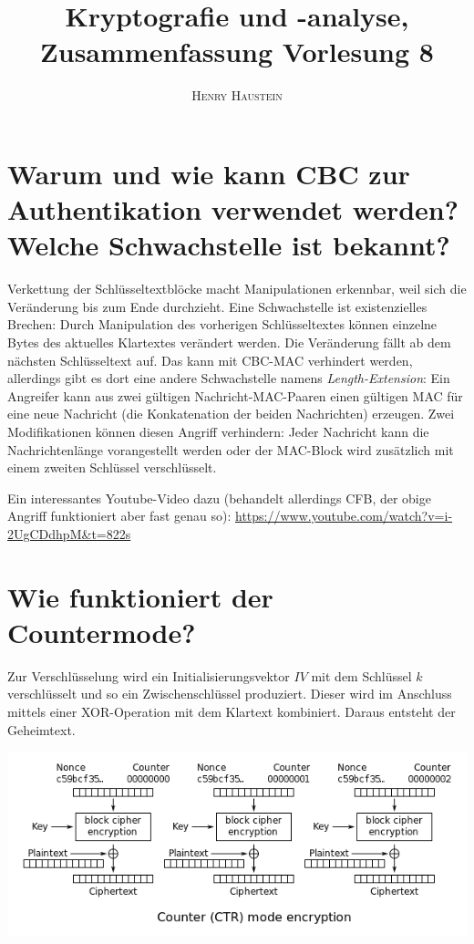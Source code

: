 \documentclass{article}
\title{\textbf{Kryptografie und -analyse, Zusammenfassung Vorlesung 8}}
\author{\textsc{Henry Haustein}}
\date{}
\begin{document}
	\maketitle
	
	\section*{Warum und wie kann CBC zur Authentikation verwendet werden? Welche Schwachstelle ist bekannt?}
	Verkettung der Schlüsseltextblöcke macht Manipulationen erkennbar, weil sich die Veränderung bis zum Ende durchzieht. Eine Schwachstelle ist existenzielles Brechen: Durch Manipulation des vorherigen Schlüsseltextes können einzelne Bytes des aktuelles Klartextes verändert werden. Die Veränderung fällt ab dem nächsten Schlüsseltext auf. Das kann mit CBC-MAC verhindert werden, allerdings gibt es dort eine andere Schwachstelle namens \textit{Length-Extension}: Ein Angreifer kann aus zwei gültigen Nachricht-MAC-Paaren einen gültigen MAC für eine neue Nachricht (die Konkatenation der beiden Nachrichten) erzeugen. Zwei Modifikationen können diesen Angriff verhindern: Jeder Nachricht kann die Nachrichtenlänge vorangestellt werden oder der MAC-Block wird zusätzlich mit einem zweiten Schlüssel verschlüsselt.
	
	Ein interessantes Youtube-Video dazu (behandelt allerdings CFB, der obige Angriff funktioniert aber fast genau so): \url{https://www.youtube.com/watch?v=i-2UgCDdhpM&t=822s}
	
	\section*{Wie funktioniert der Countermode?}
	Zur Verschlüsselung wird ein Initialisierungsvektor $IV$ mit dem Schlüssel $k$ verschlüsselt und so ein Zwischenschlüssel produziert. Dieser wird im Anschluss mittels einer XOR-Operation mit dem Klartext kombiniert. Daraus entsteht der Geheimtext.
	\begin{center}
		\includegraphics[scale=0.7]{CTR}
	\end{center}
	
\end{document}
